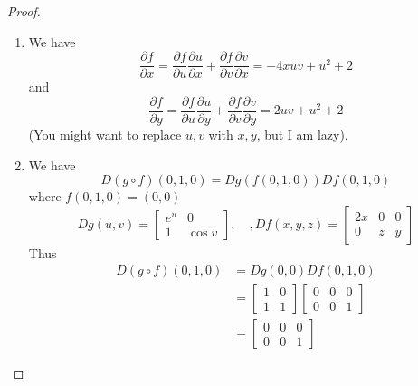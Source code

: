 \documentclass[openany]{book}
\begin{document}
\begin{proof}
    \begin{enumerate}
        \item We have 
        \begin{equation*}
            \frac{\partial f}{\partial x}=\frac{\partial f}{\partial u}\frac{\partial u}{\partial x}+\frac{\partial f}{\partial v}\frac{\partial v}{\partial x}=-4xuv+u^2+2
        \end{equation*}
        and 
        \begin{equation*}
            \frac{\partial f}{\partial y}=\frac{\partial f}{\partial u}\frac{\partial u}{\partial y}+\frac{\partial f}{\partial v}\frac{\partial v}{\partial y}=2uv+u^2+2
        \end{equation*}
        (You might want to replace $u,v$ with $x,y$, but I am lazy).
        \item We have 
        \begin{equation*}
            D(g\circ f)(0,1,0)=Dg(f(0,1,0))Df(0,1,0)
        \end{equation*}
        where $f(0,1,0)=(0,0)$
        \begin{equation*}
            Dg(u,v)=\begin{bmatrix}
                e^u&0\\
                1&\cos v
            \end{bmatrix}, \quad, Df(x,y,z)=\begin{bmatrix}
                2x&0&0\\
                0&z&y
            \end{bmatrix}
        \end{equation*}
        Thus 
        \begin{align*}
            D(g\circ f)(0,1,0)&=Dg(0,0)Df(0,1,0)\\
            &=\begin{bmatrix}
                1&0\\
                1&1
            \end{bmatrix}
            \begin{bmatrix}
                0&0&0\\
                0&0&1
            \end{bmatrix}\\
            &=\begin{bmatrix}
                0&0&0\\
                0&0&1
            \end{bmatrix}
        \end{align*}

\end{enumerate}
\end{proof}
\end{document}
